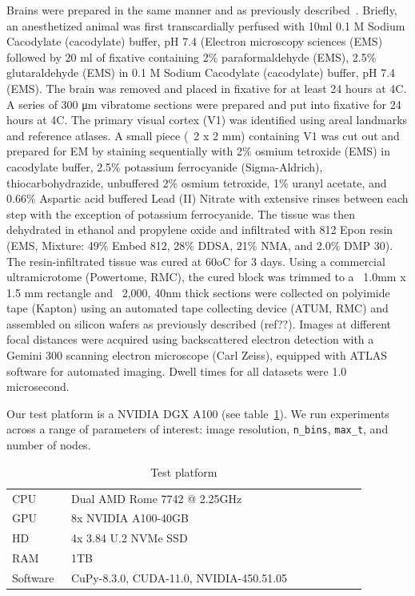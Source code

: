 \documentclass[sigconf,nonacm]{acmart}
\begin{document}
Brains were prepared in the same manner and as previously described~\cite{}. 
Briefly, an anesthetized animal was first transcardially perfused with 10ml 0.1 M Sodium Cacodylate (cacodylate) buffer, pH 7.4 (Electron microscopy sciences (EMS) followed by 20 ml of fixative containing 2\% paraformaldehyde (EMS), 2.5\% glutaraldehyde (EMS) in 0.1 M Sodium Cacodylate (cacodylate) buffer, pH 7.4 (EMS). 
The brain was removed and placed in fixative for at least 24 hours at 4C.
A series of 300 μm vibratome sections were prepared and put into fixative for 24 hours at 4C.
The primary visual cortex (V1) was identified using areal landmarks and reference atlases.
A small piece (~2 x 2 mm) containing V1 was cut out and prepared for EM by staining sequentially with 2\% osmium tetroxide (EMS) in cacodylate buffer, 2.5\% potassium ferrocyanide (Sigma-Aldrich), thiocarbohydrazide, unbuffered 2\% osmium tetroxide, 1\% uranyl acetate, and 0.66\% Aspartic acid buffered Lead (II) Nitrate with extensive rinses between each step with the exception of potassium ferrocyanide.
The tissue was then dehydrated in ethanol and propylene oxide and infiltrated with 812 Epon resin (EMS, Mixture: 49\% Embed 812, 28\% DDSA, 21\% NMA, and 2.0\% DMP 30).
The resin-infiltrated tissue was cured at 60oC for 3 days.
Using a commercial ultramicrotome (Powertome, RMC), the cured block was trimmed to a ~1.0mm x 1.5 mm rectangle and ~2,000, 40nm thick sections were collected on polyimide tape (Kapton) using an automated tape collecting device (ATUM, RMC) and assembled on silicon wafers as previously described (ref??). Images at different focal distances were acquired using backscattered electron detection with a Gemini 300 scanning electron microscope (Carl Zeiss), equipped with ATLAS software for automated imaging. Dwell times for all datasets were 1.0 microsecond.

Our test platform is a NVIDIA DGX A100 (see table~\ref{tab:test}).
We run experiments across a range of parameters of interest: image resolution, \texttt{n\_bins}, \texttt{max\_t}, and number of nodes.

\begin{table}
\caption{Test platform}

\vspace{-2ex}

\centering
\begin{tabular}[t]{p{0.15\linewidth}p{0.75\linewidth}}
\hline
CPU & Dual AMD Rome 7742 @ 2.25GHz \\
GPU & 8x NVIDIA A100-40GB \\
HD & 4x 3.84 U.2 NVMe SSD \\
RAM & 1TB \\
Software & CuPy-8.3.0, CUDA-11.0, NVIDIA-450.51.05\\
\hline

\end{tabular}
\label{tab:test}
\end{table}%
\end{document}
